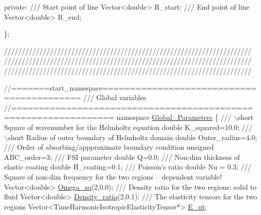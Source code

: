 \begin{DoxyCodeInclude}
\textcolor{keyword}{private}:
 \textcolor{comment}{}
\textcolor{comment}{ /// Start point of line}
\textcolor{comment}{} Vector<double> R\_start;
 \textcolor{comment}{}
\textcolor{comment}{ /// End point of line}
\textcolor{comment}{} Vector<double> R\_end;

\};


\textcolor{comment}{}
\textcolor{comment}{//////////////////////////////////////////////////////////////////////}
\textcolor{comment}{//////////////////////////////////////////////////////////////////////}
\textcolor{comment}{//////////////////////////////////////////////////////////////////////}
\textcolor{comment}{}

\textcolor{comment}{//=======start\_namespace==========================================}\textcolor{comment}{}
\textcolor{comment}{/// Global variables}
\textcolor{comment}{}\textcolor{comment}{//================================================================}
\textcolor{keyword}{namespace }\hyperlink{namespaceGlobal__Parameters}{Global\_Parameters}
\{
\textcolor{comment}{}
\textcolor{comment}{ /// \(\backslash\)short Square of wavenumber for the Helmholtz equation}
\textcolor{comment}{} \textcolor{keywordtype}{double} K\_squared=10.0;
 \textcolor{comment}{}
\textcolor{comment}{ /// \(\backslash\)short Radius of outer boundary of Helmholtz domain}
\textcolor{comment}{} \textcolor{keywordtype}{double} Outer\_radius=4.0; 
\textcolor{comment}{}
\textcolor{comment}{ /// Order of absorbing/appproximate boundary condition}
\textcolor{comment}{} \textcolor{keywordtype}{unsigned} ABC\_order=3;
\textcolor{comment}{}
\textcolor{comment}{ /// FSI parameter}
\textcolor{comment}{} \textcolor{keywordtype}{double} Q=0.0;
\textcolor{comment}{}
\textcolor{comment}{ /// Non-dim thickness of elastic coating}
\textcolor{comment}{} \textcolor{keywordtype}{double} H\_coating=0.1; 
 \textcolor{comment}{}
\textcolor{comment}{ /// Poisson's ratio}
\textcolor{comment}{} \textcolor{keywordtype}{double} Nu = 0.3;
\textcolor{comment}{}
\textcolor{comment}{ /// Square of non-dim frequency for the two regions -- dependent variable!}
\textcolor{comment}{} Vector<double> \hyperlink{namespaceGlobal__Parameters_af9e1e178dfb7f5e35b452599bd4c4324}{Omega\_sq}(2,0.0);
  \textcolor{comment}{}
\textcolor{comment}{ /// Density ratio for the two regions: solid to fluid}
\textcolor{comment}{} Vector<double> \hyperlink{namespaceGlobal__Parameters_a517d4c31b8bce6563c2f605266dd9679}{Density\_ratio}(2,0.1);
\textcolor{comment}{}
\textcolor{comment}{ /// The elasticity tensors for the two regions}
\textcolor{comment}{} Vector<TimeHarmonicIsotropicElasticityTensor*> \hyperlink{namespaceGlobal__Parameters_a73c731fa617a9d92851e4195493262e7}{E\_pt};

\end{DoxyCodeInclude}
